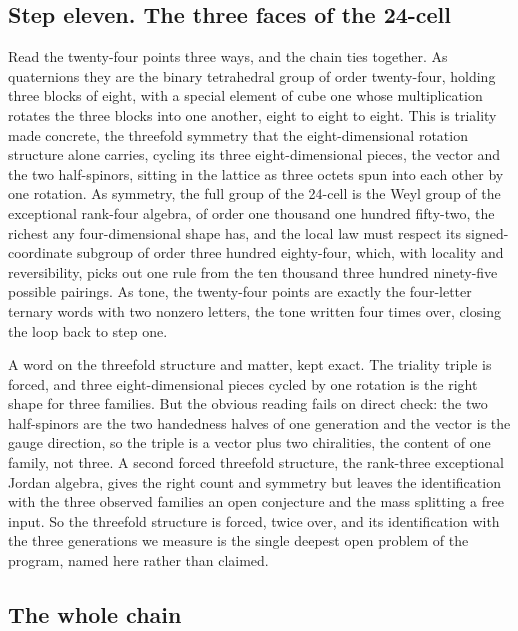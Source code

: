 \subsection*{Step eleven. The three faces of the 24-cell}

Read the twenty-four points three ways, and the chain ties together. As quaternions they are the binary tetrahedral group of order twenty-four, holding three blocks of eight, with a special element of cube one whose multiplication rotates the three blocks into one another, eight to eight to eight. This is triality made concrete, the threefold symmetry that the eight-dimensional rotation structure alone carries, cycling its three eight-dimensional pieces, the vector and the two half-spinors, sitting in the lattice as three octets spun into each other by one rotation. As symmetry, the full group of the 24-cell is the Weyl group of the exceptional rank-four algebra, of order one thousand one hundred fifty-two, the richest any four-dimensional shape has, and the local law must respect its signed-coordinate subgroup of order three hundred eighty-four, which, with locality and reversibility, picks out one rule from the ten thousand three hundred ninety-five possible pairings. As tone, the twenty-four points are exactly the four-letter ternary words with two nonzero letters, the tone written four times over, closing the loop back to step one.

A word on the threefold structure and matter, kept exact. The triality triple is forced, and three eight-dimensional pieces cycled by one rotation is the right shape for three families. But the obvious reading fails on direct check: the two half-spinors are the two handedness halves of one generation and the vector is the gauge direction, so the triple is a vector plus two chiralities, the content of one family, not three. A second forced threefold structure, the rank-three exceptional Jordan algebra, gives the right count and symmetry but leaves the identification with the three observed families an open conjecture and the mass splitting a free input. So the threefold structure is forced, twice over, and its identification with the three generations we measure is the single deepest open problem of the program, named here rather than claimed.

\subsection*{The whole chain}

